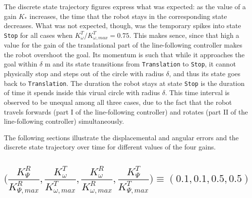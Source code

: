 The discrete state trajectory figures express what was expected: as the value
of a gain $K_{*}$ increases, the time that the robot stays in the corresponding
state decreases. What was not expected, though, was the temporary spikes into
state \texttt{Stop} for all cases when $K_{\omega}^T / K_{\omega,max}^T = 0.75$.
This makes sence, since that high a value for the gain of the translational
part of the line-following controller makes the robot overshoot the goal. Its
momentum is such that while it approaches the goal within $\delta$ m and its
state transitions from \texttt{Translation} to \texttt{Stop}, it cannot physically
stop and steps out of the circle with radius $\delta$, and thus its state goes back
to \texttt{Translation}. The duration the robot stays at state \texttt{Stop} is
the duration of time it spends inside this virual circle with radius $\delta$.
This time interval is observed to be unequal among all three cases, due to the
fact that the robot travels forwards (part I of the line-following controller)
and rotates (part II of the line-following controller) simultaneously.

The following sections illustrate the displacemental and angular errors and
the discrete state trajectory over time for different values of the four gains.


\subsection*{$\Bigg(
  \dfrac{K_{\Psi}^R}{K_{\Psi,max}^R},
  \dfrac{K_{\omega}^T}{K_{\omega,max}^T},
  \dfrac{K_{\omega}^R}{K_{\omega,max}^R},
  \dfrac{K_{\Psi}^T}{K_{\Psi,max}^T}\Bigg) \equiv (0.1, 0.1, 0.5, 0.5)$}

